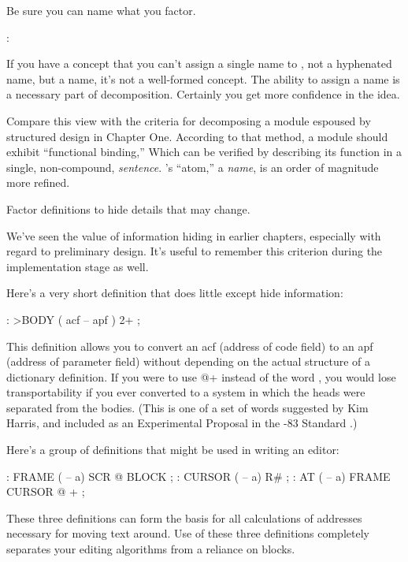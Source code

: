 \begin{tip}
Be sure you can name what you factor.
\end{tip}

\medbreak
\begin{interview}
:
\begin{tfquot}
If you have a concept that you can't assign a single name to , not a
hyphenated name, but a name, it's not a well-formed concept. The
ability to assign a name is a necessary part of decomposition.
Certainly you get more confidence in the idea.
\end{tfquot}
\end{interview}
Compare this view with the criteria for decomposing a module espoused
by structured design in Chapter One. According to that method, a module
should exhibit ``functional binding,'' Which can be verified by
describing its function in a single, non-compound, \emph{sentence}.
\Forth{}'s ``atom,'' a \emph{name}, is an order of magnitude more
refined.

\begin{tip}
Factor definitions to hide details that may change.
\end{tip}
We've seen the value of information hiding in earlier chapters,
especially with regard to preliminary design. It's useful to remember
this criterion during the implementation stage as well.

Here's a very short definition that does little except hide information:

\begin{Code}
: >BODY  ( acf -- apf )  2+ ;
\end{Code}
This definition allows you to convert an acf (address of code field) to
an apf (address of parameter field) without depending on the actual
structure of a dictionary definition. If you were to use @+ instead of
the word , you would lose transportability if you ever
converted to a \Forth{} system in which the heads were separated from
the bodies. (This is one of a set of words suggested by Kim Harris,
and included as an Experimental Proposal in the \Forth{}-83 Standard
\cite{harris83}.)

Here's a group of definitions that might be used in writing an editor:

\begin{Code}
: FRAME  ( -- a)  SCR @ BLOCK ;
: CURSOR  ( -- a)  R# ;
: AT  ( -- a)  FRAME  CURSOR @ + ;
\end{Code}
These three definitions can form the basis for all calculations of
addresses necessary for moving text around. Use of these three
definitions completely separates your editing algorithms from a
reliance on \Forth{} blocks.


